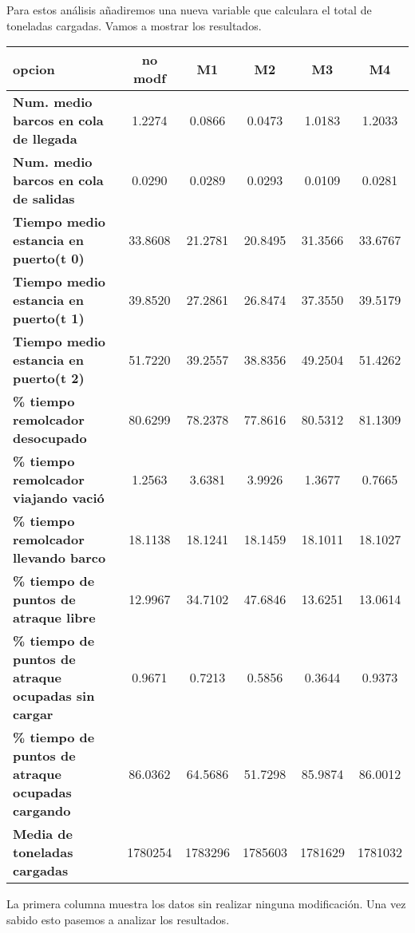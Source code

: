 \documentclass[]{article}
\begin{document}
Para estos análisis añadiremos una nueva variable que calculara el total de toneladas cargadas. Vamos a mostrar los resultados.

\begin{table}[H]
	\begin{center}
		\begin{tabularx}{1\textwidth}{|X|c|c|c|c|c|}
			\hline
			\textbf{opcion}&\textbf{no modf} &  \textbf{M1} & \textbf{M2} &\textbf{M3} & \textbf{M4}\\
			\hline \hline
			\textbf{Num. medio barcos en cola de llegada}& 1.2274 & 0.0866 &0.0473 &1.0183 &1.2033 \\ \hline
			\textbf{Num. medio barcos en cola de salidas}& 0.0290& 0.0289& 0.0293 &0.0109 &0.0281 \\ \hline
			\textbf{Tiempo medio estancia en puerto(t 0)}& 33.8608& 21.2781&20.8495 &31.3566 &33.6767 \\ \hline
			\textbf{Tiempo medio estancia en puerto(t 1)}& 39.8520& 27.2861&26.8474 &37.3550 &39.5179 \\ \hline
			\textbf{Tiempo medio estancia en puerto(t 2)}& 51.7220& 39.2557&38.8356 &49.2504 &51.4262 \\ \hline
			\textbf{\% tiempo remolcador desocupado}& 80.6299&78.2378 &77.8616 &80.5312 &81.1309 \\ \hline
			\textbf{\% tiempo remolcador viajando vació}& 1.2563& 3.6381&3.9926 &1.3677 &0.7665 \\ \hline
			\textbf{\% tiempo remolcador llevando barco}& 18.1138& 18.1241&18.1459 &18.1011 &18.1027 \\ \hline
			\textbf{\% tiempo de puntos de atraque libre}& 12.9967& 34.7102&47.6846 &13.6251 &13.0614 \\ \hline
			\textbf{\% tiempo de puntos de atraque ocupadas sin cargar}& 0.9671 &0.7213 &0.5856 &0.3644 & 0.9373\\ \hline
			\textbf{\% tiempo de puntos de atraque ocupadas cargando}& 86.0362 &64.5686 &51.7298 & 85.9874 &86.0012 \\ \hline
			\textbf{Media de toneladas cargadas}& 1780254 & 1783296 & 1785603& 1781629 & 1781032  \\ \hline
		\end{tabularx}
		
	\end{center}
\end{table}

La primera columna muestra los datos sin realizar ninguna modificación. Una vez sabido esto pasemos a analizar los resultados.
\end{document}
